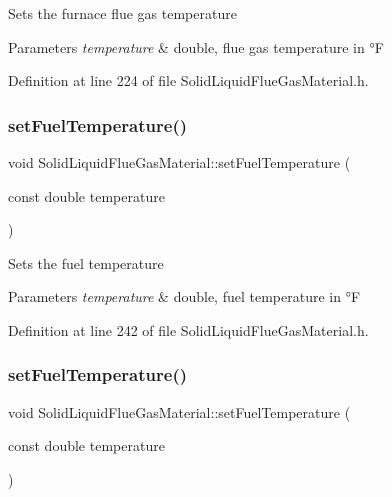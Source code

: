 Sets the furnace flue gas temperature 
\begin{DoxyParams}{Parameters}
{\em temperature} & double, flue gas temperature in °F \\
\hline
\end{DoxyParams}


Definition at line 224 of file Solid\+Liquid\+Flue\+Gas\+Material.\+h.

\mbox{\label{class_solid_liquid_flue_gas_material_a420ba1234c5f8c4b93f190b61046a589}} 
\subsubsection{\texorpdfstring{set\+Fuel\+Temperature()}{setFuelTemperature()}\hspace{0.1cm}{\footnotesize\ttfamily [1/3]}}
{\footnotesize\ttfamily void Solid\+Liquid\+Flue\+Gas\+Material\+::set\+Fuel\+Temperature (\begin{DoxyParamCaption}\item[{const double}]{temperature }\end{DoxyParamCaption})\hspace{0.3cm}{\ttfamily [inline]}}

Sets the fuel temperature 
\begin{DoxyParams}{Parameters}
{\em temperature} & double, fuel temperature in °F \\
\hline
\end{DoxyParams}


Definition at line 242 of file Solid\+Liquid\+Flue\+Gas\+Material.\+h.

\mbox{\label{class_solid_liquid_flue_gas_material_a420ba1234c5f8c4b93f190b61046a589}} 
\subsubsection{\texorpdfstring{set\+Fuel\+Temperature()}{setFuelTemperature()}\hspace{0.1cm}{\footnotesize\ttfamily [2/3]}}
{\footnotesize\ttfamily void Solid\+Liquid\+Flue\+Gas\+Material\+::set\+Fuel\+Temperature (\begin{DoxyParamCaption}\item[{const double}]{temperature }\end{DoxyParamCaption})\hspace{0.3cm}{\ttfamily [inline]}}

